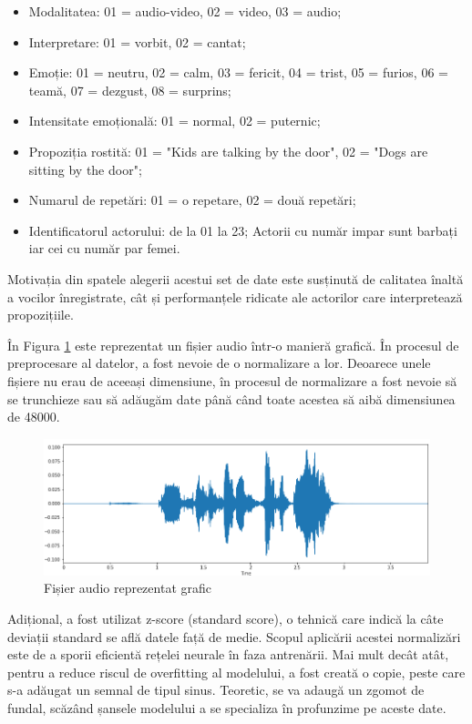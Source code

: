 \documentclass[a4paper, 12pt]{report}
\begin{document}
	\begin{itemize}
		\item Modalitatea: 01 = audio-video, 02 = video, 03 = audio;
		\item Interpretare: 01 = vorbit, 02 = cantat;
		\item Emoție: 01 = neutru, 02 = calm, 03 = fericit, 04 = trist, 05 = furios, 06 = teamă, 07 = dezgust, 08 = surprins;
		\item Intensitate emoțională: 01 = normal, 02 = puternic;
		\item Propoziția rostită: 01 = "Kids are talking by the door", 02 = "Dogs are sitting by the door";
		\item Numarul de repetări: 01 = o repetare, 02 = două repetări;
		\item Identificatorul actorului: de la 01 la 23; Actorii cu număr impar sunt barbați iar cei cu număr par femei.
	\end{itemize}

	Motivația din spatele alegerii acestui set de date este susținută de calitatea înaltă a vocilor înregistrate, cât și performanțele ridicate ale actorilor care interpretează propozițiile.
	
	În Figura \ref{fig:audio_plot} este reprezentat un fișier audio într-o manieră grafică. În procesul de preprocesare al datelor, a fost nevoie de o normalizare a lor. Deoarece unele fișiere nu erau de aceeași dimensiune, în procesul de normalizare a fost nevoie să se trunchieze sau să adăugăm date până când toate acestea să aibă dimensiunea de 48000.
	
	\begin{figure}[H]
		\begin{center}
			\includegraphics[scale=0.6]{images/audio_plot.png}
		\end{center}
		\caption{Fișier audio reprezentat grafic}
		\label{fig:audio_plot}
	\end{figure}
	
	Adițional, a fost utilizat z-score (standard score), o tehnică care indică la câte deviații standard se află datele față de medie. Scopul aplicării acestei normalizări este de a sporii eficientă rețelei neurale în faza antrenării. Mai mult decât atât, pentru a reduce riscul de overfitting al modelului, a fost creată o copie, peste care s-a adăugat un semnal de tipul sinus. Teoretic, se va adaugă un zgomot de fundal, scăzând șansele modelului a se specializa în profunzime pe aceste date.
	
\end{document}
